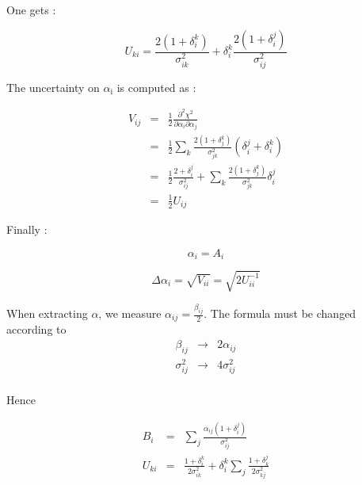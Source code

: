 One gets :

\begin{equation}
U_{ki}  =  \frac{2(1+\delta_i^k)}{\sigma_{ik}^2} +  \delta_i^k \frac{2(1+\delta_i^j)}{\sigma_{ij}^2}
\end{equation}

The uncertainty on \(\alpha_{\text{i}}\) is computed as :

\begin{equation}
\begin{array}{lcl}
V_{ij} &=& \frac{1}{2} \frac{\partial^2\chi^2}{\partial\alpha_i\partial\alpha_j} \\
&=& \frac{1}{2} \sum\limits_k \frac{2(1+\delta_j^k)}{\sigma_{jk}^2} (\delta_i^j + \delta_i^k) \\
&=& \frac{1}{2} \frac{2 + \delta_i^j}{\sigma_{ij}^2} + \sum\limits_k \frac{2(1+\delta_j^k)}{\sigma_{jk}^2} \delta_i^j \\
&=& \frac{1}{2} U_{ij}
 \end{array}
\end{equation}


Finally :

\begin{equation}
\alpha_i = A_i
\end{equation}


\begin{equation}
\Delta\alpha_i = \sqrt{V_{ii}} = \sqrt{2U_{ii}^{-1}}
\end{equation}

When extracting \(\alpha\), we measure \(\alpha_{ij}=\frac{\beta_{ij}}{2}\).
The formula must be changed according to
\begin{equation}
\begin{array}{lcl}
\beta_{ij} &\rightarrow & 2\alpha_{ij} \\
\sigma_{ij}^2 &\rightarrow & 4\sigma_{ij}^2 \\
\end{array}
\end{equation}


Hence


\begin{equation}
\begin{array}{lcl}
B_i &=& \sum\limits_j \frac{\alpha_{ij}(1+\delta_i^j)}{\sigma_{ij}^2} \\
U_{ki} &= &\frac{1+\delta_i^k}{2\sigma_{ik}^2} + \delta_i^k\sum\limits_j \frac{1+\delta_k^j}{2\sigma_{kj}^2}
\end{array}
\end{equation}

